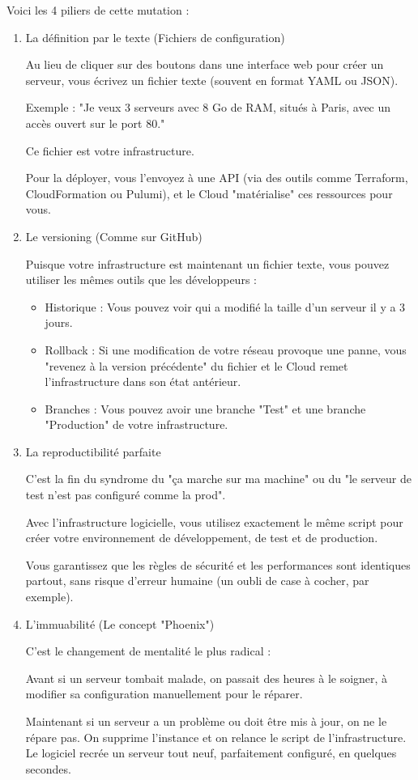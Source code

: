\documentclass{report} %
\begin{document}
Voici les 4 piliers de cette mutation :
\begin{enumerate}
\item La définition par le texte (Fichiers de configuration)

  Au lieu de cliquer sur des boutons dans une interface web pour créer
  un serveur, vous écrivez un fichier texte (souvent en format YAML ou
  JSON).

  Exemple : "Je veux 3 serveurs avec 8 Go de RAM, situés à Paris, avec
  un accès ouvert sur le port 80."

  Ce fichier est votre infrastructure.

  Pour la déployer, vous l'envoyez à une API (via des outils comme
  Terraform, CloudFormation ou Pulumi), et le Cloud "matérialise" ces
  ressources pour vous.

  \item Le versioning (Comme sur GitHub)

    Puisque votre infrastructure est maintenant un fichier texte, vous
    pouvez utiliser les mêmes outils que les développeurs :
    \begin{itemize}
    \item Historique : Vous pouvez voir qui a modifié la taille d'un serveur il y a 3 jours.
    \item Rollback : Si une modification de votre réseau provoque une
      panne, vous "revenez à la version précédente" du fichier et le
      Cloud remet l'infrastructure dans son état antérieur.
    \item Branches : Vous pouvez avoir une branche "Test" et une branche "Production" de votre infrastructure.
    \end{itemize}

  \item La reproductibilité parfaite

    C'est la fin du syndrome du "ça marche sur ma machine" ou du "le
    serveur de test n'est pas configuré comme la prod".

    Avec l'infrastructure logicielle, vous utilisez exactement le même
    script pour créer votre environnement de développement, de test et
    de production.

    Vous garantissez que les règles de sécurité et les performances
    sont identiques partout, sans risque d'erreur humaine (un oubli de
    case à cocher, par exemple).

  \item  L'immuabilité (Le concept "Phoenix")

    C'est le changement de mentalité le plus radical :

    Avant si un serveur tombait
    malade, on passait des heures à le soigner, à modifier sa
    configuration manuellement pour le réparer.

    Maintenant si un serveur a un problème ou
    doit être mis à jour, on ne le répare pas. On supprime l'instance
    et on relance le script de l'infrastructure. Le logiciel recrée un
    serveur tout neuf, parfaitement configuré, en quelques secondes.
  \end{enumerate}
\end{document}
